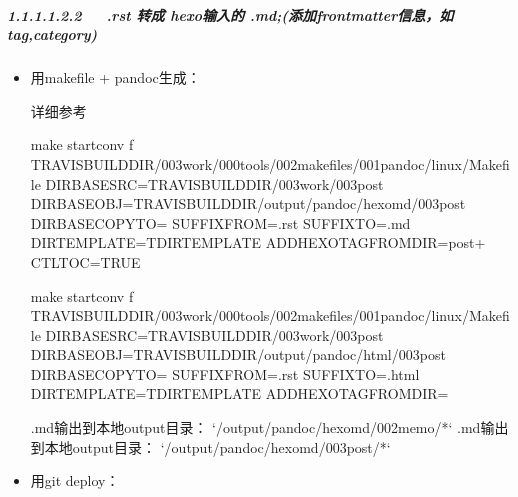 \documentclass[letterpaper,12pt,english]{sphinxmanual}
\begin{document}
\subparagraph{1.1.1.1.2.2   .rst 转成 hexo输入的 .md;(添加frontmatter信息，如tag,category)}
\label{\detokenize{001software/001install/001._u7f51_u7ad9/gitpage:rst-hexo-md-frontmatter-tag-category}}\begin{itemize}
\item {} 
用makefile + pandoc生成：

详细参考 

\begin{sphinxVerbatim}[commandchars=\\\{\}]
make startconv \PYGZhy{}f \PYGZdl{}TRAVIS\PYGZus{}BUILD\PYGZus{}DIR/003work/000tools/002makefiles/001pandoc/linux/Makefile DIR\PYGZus{}BASE\PYGZus{}SRC=\PYGZdl{}TRAVIS\PYGZus{}BUILD\PYGZus{}DIR/003work/003post DIR\PYGZus{}BASE\PYGZus{}OBJ=\PYGZdl{}TRAVIS\PYGZus{}BUILD\PYGZus{}DIR/output/pandoc/hexomd/003post DIR\PYGZus{}BASE\PYGZus{}COPYTO= SUFFIX\PYGZus{}FROM=.rst SUFFIX\PYGZus{}TO=.md DIR\PYGZus{}TEMPLATE=\PYGZdl{}T\PYGZus{}DIR\PYGZus{}TEMPLATE ADD\PYGZus{}HEXO\PYGZus{}TAG\PYGZus{}FROM\PYGZus{}DIR=post+ CTL\PYGZus{}TOC=TRUE

make startconv \PYGZhy{}f \PYGZdl{}TRAVIS\PYGZus{}BUILD\PYGZus{}DIR/003work/000tools/002makefiles/001pandoc/linux/Makefile DIR\PYGZus{}BASE\PYGZus{}SRC=\PYGZdl{}TRAVIS\PYGZus{}BUILD\PYGZus{}DIR/003work/003post DIR\PYGZus{}BASE\PYGZus{}OBJ=\PYGZdl{}TRAVIS\PYGZus{}BUILD\PYGZus{}DIR/output/pandoc/html/003post DIR\PYGZus{}BASE\PYGZus{}COPYTO= SUFFIX\PYGZus{}FROM=.rst SUFFIX\PYGZus{}TO=.html DIR\PYGZus{}TEMPLATE=\PYGZdl{}T\PYGZus{}DIR\PYGZus{}TEMPLATE ADD\PYGZus{}HEXO\PYGZus{}TAG\PYGZus{}FROM\PYGZus{}DIR=
\end{sphinxVerbatim}

\begin{sphinxVerbatim}[commandchars=\\\{\}]
.md输出到本地output目录： {}`/output/pandoc/hexomd/002memo/*{}`
.md输出到本地output目录： {}`/output/pandoc/hexomd/003post/*{}`
\end{sphinxVerbatim}

\item {} 
用git deploy：

\begin{sphinxVerbatim}[commandchars=\\\{\}]
  
    
 
\end{sphinxVerbatim}


\end{itemize}
\end{document}
